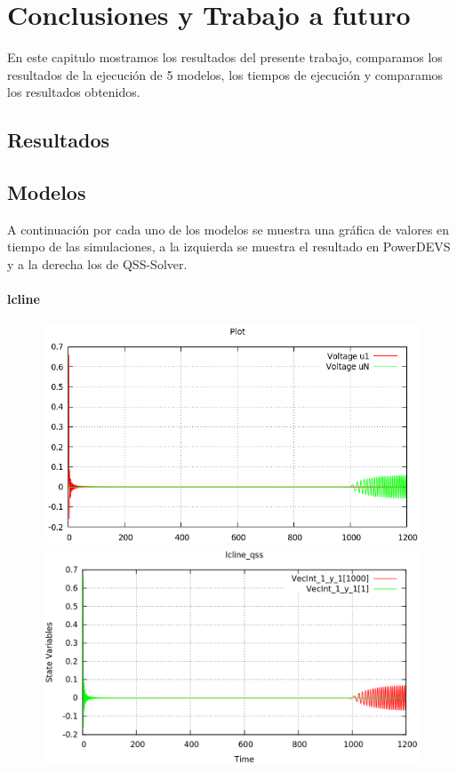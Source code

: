 \documentclass[a4paper,	11pt]{report}
\begin{document}
\chapter{Conclusiones y Trabajo a futuro}
En este capitulo mostramos los resultados del presente trabajo, comparamos los resultados de la ejecución de 5 modelos, los tiempos de ejecución y comparamos los resultados obtenidos.

\section{Resultados}

\section{Modelos}
A continuación por cada uno de los modelos se muestra una gráfica de valores en tiempo de las simulaciones, a la izquierda se muestra el resultado en PowerDEVS y a la derecha los de QSS-Solver.

\subsubsection{lcline}
\begin{figure}[H]
\centering
\begin{minipage}{0.5\textwidth}
\centering
 \includegraphics[width=\linewidth]{lcline-pd}
\end{minipage}\hfill
\begin{minipage}{0.5\textwidth}
\centering
 \includegraphics[width=\linewidth]{lcline-qss}
\end{minipage}
\end{figure}
\end{document}
